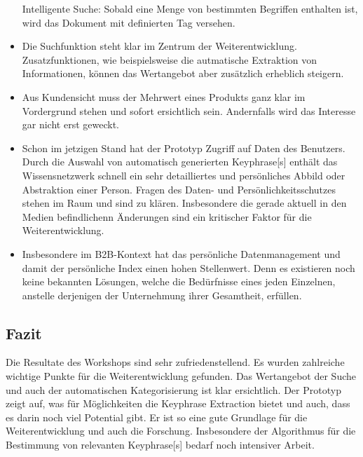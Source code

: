 \begin{itemize}
    Intelligente Suche: Sobald eine Menge von bestimmten Begriffen enthalten ist, wird das Dokument mit definierten Tag versehen.
    \item Die Suchfunktion steht klar im Zentrum der Weiterentwicklung. Zusatzfunktionen, wie beispielsweise die autmatische Extraktion von Informationen, können das Wertangebot aber zusätzlich erheblich steigern.
    \item Aus Kundensicht muss der Mehrwert eines Produkts ganz klar im Vordergrund stehen und sofort ersichtlich sein. Andernfalls wird das Interesse gar nicht erst geweckt.
    \item Schon im jetzigen Stand hat der Prototyp Zugriff auf Daten des Benutzers. Durch die Auswahl von automatisch generierten \gls{Keyphrase}[s] enthält das Wissensnetzwerk schnell ein sehr detailliertes und persönliches Abbild oder Abstraktion einer Person. Fragen des Daten- und Persönlichkeitsschutzes stehen im Raum und sind zu klären. Insbesondere die gerade aktuell in den Medien befindlichenn Änderungen sind ein kritischer Faktor für die Weiterentwicklung.
    \item Insbesondere im B2B-Kontext hat das persönliche Datenmanagement und damit der persönliche Index einen hohen Stellenwert. Denn es existieren noch keine bekannten Lösungen, welche die Bedürfnisse eines jeden Einzelnen, anstelle derjenigen der Unternehmung ihrer Gesamtheit, erfüllen. 
\end{itemize}


\subsection{Fazit}

Die Resultate des Workshops sind sehr zufriedenstellend. Es wurden zahlreiche wichtige Punkte für die Weiterentwicklung gefunden. Das Wertangebot der Suche und auch der automatischen Kategorisierung ist klar ersichtlich. Der Prototyp zeigt auf, was für Möglichkeiten die \gls{Keyphrase} Extraction bietet und auch, dass es darin noch viel Potential gibt. Er ist so eine gute Grundlage für die Weiterentwicklung und auch die Forschung. Insbesondere der Algorithmus für die Bestimmung von relevanten \gls{Keyphrase}[s] bedarf noch intensiver Arbeit.

